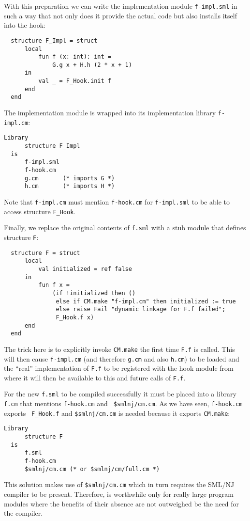 With this preparation we can write the implementation module {\tt f-impl.sml}
in such a way that not only does it provide the actual
code but also installs itself into the hook:
\begin{lstlisting}
  structure F_Impl = struct
      local
          fun f (x: int): int =
              G.g x + H.h (2 * x + 1)
      in
          val _ = F_Hook.init f
      end
  end
\end{lstlisting}%
\noindent The implementation module is wrapped into its implementation
library {\tt f-impl.cm}:
\begin{lstlisting}[language=CM]
  Library
      structure F_Impl
  is
      f-impl.sml
      f-hook.cm
      g.cm       (* imports G *)
      h.cm       (* imports H *)
\end{lstlisting}%
\noindent Note that {\tt f-impl.cm} must mention {\tt f-hook.cm} for
{\tt f-impl.sml} to be able to access structure {\tt F\_Hook}.

Finally, we replace the original contents of {\tt f.sml} with a stub
module that defines structure {\tt F}:
\begin{lstlisting}
  structure F = struct
      local
          val initialized = ref false
      in
          fun f x =
              (if !initialized then ()
               else if CM.make "f-impl.cm" then initialized := true
               else raise Fail "dynamic linkage for F.f failed";
               F_Hook.f x)
      end
  end
\end{lstlisting}%
\noindent The trick here is to explicitly invoke {\tt CM.make} the
first time {\tt F.f} is called.  This will then cause {\tt f-impl.cm}
(and therefore {\tt g.cm} and also {\tt h.cm}) to be loaded and the
``real'' implementation of {\tt F.f} to be registered with the hook
module from where it will then be available to this and future calls
of {\tt F.f}.

For the new {\tt f.sml} to be compiled successfully it must be placed
into a library {\tt f.cm} that mentions {\tt f-hook.cm} and {\tt
\$smlnj/cm.cm}.  As we have seen, {\tt f-hook.cm} exports {\tt
F\_Hook.f} and {\tt \$smlnj/cm.cm} is needed because it exports
{\tt CM.make}:

\begin{lstlisting}[language=CM]
  Library
      structure F
  is
      f.sml
      f-hook.cm
      $smlnj/cm.cm (* or $smlnj/cm/full.cm *)
\end{lstlisting}%

  This solution makes use of {\tt \$smlnj/cm.cm}
which in turn requires the SML/NJ compiler to be present.  Therefore,
is worthwhile only for really large program modules where the benefits
of their absence are not outweighed be the need for the compiler.
